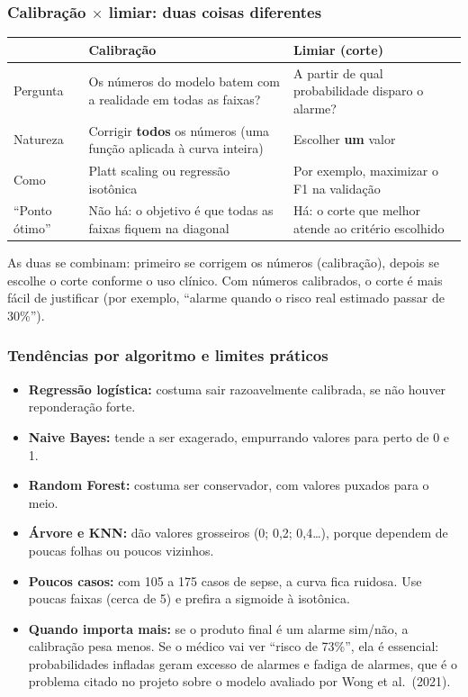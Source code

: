 \documentclass[11pt,a4paper]{article}
\begin{document}
\subsubsection*{Calibração $\times$ limiar: duas coisas diferentes}

\begin{center}
\small
\renewcommand{\arraystretch}{1.3}
\begin{tabular}{@{}lp{5.2cm}p{5.2cm}@{}}
\toprule
 & \textbf{Calibração} & \textbf{Limiar (corte)} \\
\midrule
Pergunta & Os números do modelo batem com a realidade em todas as faixas? & A partir de qual probabilidade disparo o alarme? \\
Natureza & Corrigir \textbf{todos} os números (uma função aplicada à curva inteira) & Escolher \textbf{um} valor \\
Como & Platt scaling ou regressão isotônica & Por exemplo, maximizar o F1 na validação \\
``Ponto ótimo'' & Não há: o objetivo é que todas as faixas fiquem na diagonal & Há: o corte que melhor atende ao critério escolhido \\
\bottomrule
\end{tabular}
\end{center}

As duas se combinam: primeiro se corrigem os números (calibração), depois se escolhe o corte conforme o uso clínico. Com números calibrados, o corte é mais fácil de justificar (por exemplo, ``alarme quando o risco real estimado passar de 30\%'').

\subsubsection*{Tendências por algoritmo e limites práticos}

\begin{itemize}
  \item \textbf{Regressão logística:} costuma sair razoavelmente calibrada, se não houver reponderação forte.
  \item \textbf{Naive Bayes:} tende a ser exagerado, empurrando valores para perto de 0 e 1.
  \item \textbf{Random Forest:} costuma ser conservador, com valores puxados para o meio.
  \item \textbf{Árvore e KNN:} dão valores grosseiros (0; 0,2; 0,4\ldots), porque dependem de poucas folhas ou poucos vizinhos.
  \item \textbf{Poucos casos:} com 105 a 175 casos de sepse, a curva fica ruidosa. Use poucas faixas (cerca de 5) e prefira a sigmoide à isotônica.
  \item \textbf{Quando importa mais:} se o produto final é um alarme sim/não, a calibração pesa menos. Se o médico vai ver ``risco de 73\%'', ela é essencial: probabilidades infladas geram excesso de alarmes e fadiga de alarmes, que é o problema citado no projeto sobre o modelo avaliado por Wong et al.\ (2021).
\end{itemize}
\end{document}
